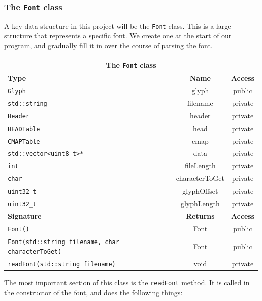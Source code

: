 \documentclass{report}
\begin{document}
\subsubsection{The \texttt{Font} class}
A key data structure in this project will be the \texttt{Font} class. This is a
large structure that represents a specific font. We create one at the start of
our program, and gradually fill it in over the course of parsing the font. 

\begin{center}
  \begin{tabular}{|p{7.5cm}|c|c|}
    \hline
    \multicolumn{3}{|c|}{The \texttt{Font} class} \\
    \hline
    \textbf{Type} & \textbf{Name} & \textbf{Access} \\
    \hline
    \texttt{Glyph} & glyph & public \\
    \hline
    \texttt{std::string} & filename & private \\
    \hline
    \texttt{Header} & header & private \\
    \hline
    \texttt{HEADTable} & head & private \\
    \hline
    \texttt{CMAPTable} & cmap & private \\
    \hline
    \texttt{std::vector<uint8\_t>*} & data & private \\
    \hline
    \texttt{int} & fileLength & private \\
    \hline
    \texttt{char} & characterToGet & private \\
    \hline
    \texttt{uint32\_t} & glyphOffset & private \\
    \hline
    \texttt{uint32\_t} & glyphLength & private \\
    \hline
    \hline
    \textbf{Signature} & \textbf{Returns} & \textbf{Access} \\
    \hline
    \texttt{Font()} & Font & public \\
    \hline
    \texttt{Font(std::string filename, char characterToGet)} & Font & public \\
    \hline
    \texttt{readFont(std::string filename)} & void & private \\
    \hline
  \end{tabular}
\end{center}

The most important section of this class is the \texttt{readFont} method. It is
called in the constructor of the font, and does the following things:
\end{document}
